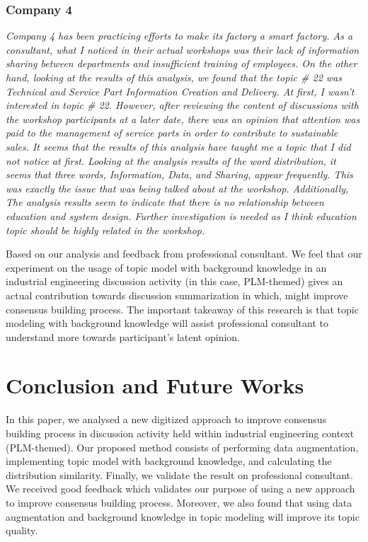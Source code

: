 \documentclass[10pt, conference, compsocconf]{IEEEtran}
\begin{document}
\subsubsection{Company 4}
{\it Company 4 has been practicing efforts to make its factory a smart factory. As a consultant, what I noticed in their actual workshops was their lack of information sharing between departments and insufficient training of employees. On the other hand, looking at the results of this analysis, we found that the topic \# 22 was Technical and Service Part Information Creation and Delivery. At first, I wasn't interested in topic \# 22. However, after reviewing the content of discussions with the workshop participants at a later date, there was an opinion that attention was paid to the management of service parts in order to contribute to sustainable sales. It seems that the results of this analysis have taught me a topic that I did not notice at first. Looking at the analysis results of the word distribution, it seems that three words, Information, Data, and Sharing, appear frequently. This was exactly the issue that was being talked about at the workshop. Additionally, The analysis results seem to indicate that there is no relationship between education and system design. Further investigation is needed as I think education topic should be highly related in the workshop.}
\medskip

Based on our analysis and feedback from professional consultant. We feel that our experiment on the usage of topic model with background knowledge in an industrial engineering discussion activity (in this case, PLM-themed) gives an actual contribution towards discussion summarization in which, might improve consensus building process. The important takeaway of this  research is that topic modeling with background knowledge will assist professional consultant to understand more towards participant's latent opinion.

\section{Conclusion and Future Works}
In this paper, we analysed a new digitized approach to improve consensus building process in discussion activity held within industrial engineering context (PLM-themed). Our proposed method consists of performing data augmentation, implementing topic model with background knowledge, and calculating the distribution similarity. Finally, we validate the result on professional consultant. We received good feedback which validates our purpose of using a new approach to improve consensus building process. Moreover, we also found that using data augmentation and background knowledge in topic modeling will improve its topic quality.
\end{document}
